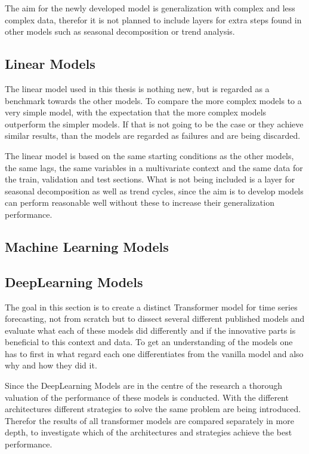 \documentclass{article}
\begin{document}
The aim for the newly developed model is generalization with complex and less complex data, therefor it is not planned to include layers for extra steps found in other models such as seasonal decomposition or trend analysis.

\subsection{Linear Models}

The linear model used in this thesis is nothing new, but is regarded as a benchmark towards the other models. To compare the more complex models to a very simple model, with the expectation that the more complex models outperform the simpler models. If that is not going to be the case or they achieve similar results, than the models are regarded as failures and are being discarded. \par 

The linear model is based on the same starting conditions as the other models, the same lags, the same variables in a multivariate context and the same data for the train, validation and test sections. What is not being included is a layer for seasonal decomposition as well as trend cycles, since the aim is to develop models can perform reasonable well without these to increase their generalization performance. 

\subsection{Machine Learning Models}


\subsection{DeepLearning Models}

The goal in this section is to create a distinct Transformer model for time series forecasting, not from scratch but to dissect several different published models and evaluate what each of these models did differently and if the innovative parts is beneficial to this context and data. To get an understanding of the models one has to first in what regard each one differentiates from the vanilla model and also why and how they did it. \par 
Since the DeepLearning Models are in the centre of the research a thorough valuation of the performance of these models is conducted. With the different architectures different strategies to solve the same problem are being introduced. Therefor the results of all transformer models are compared separately in more depth, to investigate which of the architectures and strategies achieve the best performance. 
\end{document}
